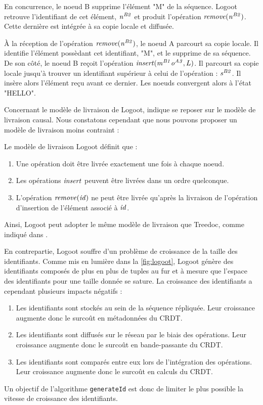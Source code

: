 En concurrence, le noeud B supprime l'élément "M" de la séquence.
Logoot retrouve l'identifiant de cet élément, $\mathit{n}^{\mathit{B2}}_{\mathit{}}$ et produit l'opération $\mathit{remove}(\mathit{n}^{\mathit{B2}}_{\mathit{}})$.
Cette dernière est intégrée à sa copie locale et diffusée.

À la réception de l'opération $\mathit{remove}(\mathit{n}^{\mathit{B2}}_{\mathit{}})$, le noeud A parcourt sa copie locale.
Il identifie l'élément possèdant cet identifiant, "M", et le supprime de sa séquence.
De son côté, le noeud B reçoit l'opération $\mathit{insert}(\mathit{m}^{\mathit{B1}}_{\mathit{}}\mathit{o}^{\mathit{A3}}_{\mathit{}}, L)$.
Il parcourt sa copie locale jusqu'à trouver un identifiant supérieur à celui de l'opération : $\mathit{s}^{\mathit{B2}}_{\mathit{}}$.
Il insère alors l'élément reçu avant ce dernier.
Les noeuds convergent alors à l'état "HELLO".

Concernant le modèle de livraison de Logoot, \cite{2009-logoot-weiss} indique se reposer sur le modèle de livraison causal.
Nous constatons cependant que nous pouvons proposer un modèle de livraison moins contraint :
\begin{definition}
  Le modèle de livraison Logoot définit que :
  \begin{enumerate}
    \item Une opération doit être livrée exactement une fois à chaque noeud.
    \item Les opérations $\mathit{insert}$ peuvent être livrées dans un ordre quelconque.
    \item L'opération $\mathit{remove}(\mathit{id})$ ne peut être livrée qu'après la livraison de l'opération d'insertion de l'élément associé à $\mathit{id}$.
  \end{enumerate}
\end{definition}
Ainsi, Logoot peut adopter le même modèle de livraison que Treedoc, comme indiqué dans \cite{2021-these-vic}.

En contrepartie, Logoot souffre d'un problème de croissance de la taille des identifiants.
Comme mis en lumière dans la \autoref{fig:logoot}, Logoot génère des identifiants composés de plus en plus de tuples au fur et à mesure que l'espace des identifiants pour une taille donnée se sature.
La croissance des identifiants a cependant plusieurs impacts négatifs :
\begin{enumerate}
  \item Les identifiants sont stockés au sein de la séquence répliquée.
    Leur croissance augmente donc le surcoût en métadonnées du \ac{CRDT}.
  \item Les identifiants sont diffusés sur le réseau par le biais des opérations.
    Leur croissance augmente donc le surcoût en bande-passante du \ac{CRDT}.
  \item Les identifiants sont comparés entre eux lors de l'intégration des opérations.
    Leur croissance augmente donc le surcoût en calculs du \ac{CRDT}.
\end{enumerate}
Un objectif de l'algorithme \texttt{generateId} est donc de limiter le plus possible la vitesse de croissance des identifiants.

